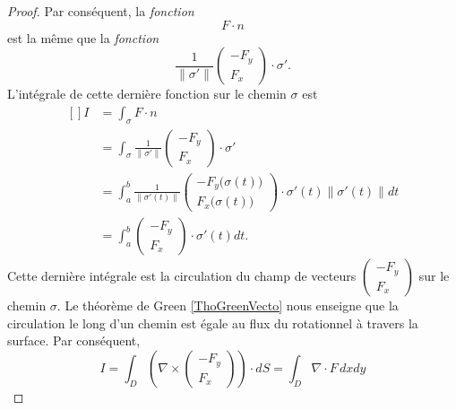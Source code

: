 \begin{proof}
    Par conséquent, la \emph{fonction}
    \begin{equation}
        F\cdot n
    \end{equation}
    est la même que la \emph{fonction} 
    \begin{equation}
        \frac{1}{ \| \sigma' \| }\begin{pmatrix}
            -F_y    \\ 
            F_x    
        \end{pmatrix}\cdot \sigma'.
    \end{equation}
    L'intégrale de cette dernière fonction sur le chemin $\sigma$ est 
    \begin{equation}
        \begin{aligned}[]
            I&=\int_{\sigma} F\cdot n\\
            &=\int_{\sigma}\frac{1}{ \| \sigma' \| }\begin{pmatrix}
                -F_y    \\ 
                F_x    
            \end{pmatrix}\cdot \sigma'\\
            &=  \int_a^b\frac{1}{ \| \sigma'(t)\| }\begin{pmatrix}
                -F_y\big( \sigma(t) \big)    \\ 
                F_x\big( \sigma(t) \big)
            \end{pmatrix}
            \cdot\sigma'(t)\| \sigma'(t) \|dt\\
            &=
            \int_a^b\begin{pmatrix}
                -F_y    \\ 
                F_x    
            \end{pmatrix}\cdot \sigma'(t)dt.
        \end{aligned}
    \end{equation}
    Cette dernière intégrale est la circulation du champ de vecteurs $\begin{pmatrix}
        -F_y    \\ 
        F_x    
    \end{pmatrix}$ sur le chemin $\sigma$. Le théorème de Green \ref{ThoGreenVecto} nous enseigne que la circulation le long d'un chemin est égale au flux du rotationnel à travers la surface. Par conséquent,
    \begin{equation}
        I=\int_D\left( \nabla\times\begin{pmatrix}
            -F_y    \\ 
            F_x    
        \end{pmatrix}\right)\cdot dS=\int_D\nabla\cdot F\, dxdy
    \end{equation}
    

\end{proof}

